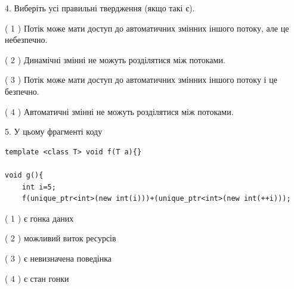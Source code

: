 \documentclass[12pt, ukrainian]{article}
\begin{document}
\begin {large}
{%
4. Виберіть усі правильні твердження (якщо такі є).\par
\vspace{2mm}

( 1 ) Потік може мати доступ до автоматичних змінних іншого потоку, але це небезпечно.%

( 2 ) Динамічні змінні не можуть розділятися між потоками.%

( 3 ) Потік може мати доступ до автоматичних змінних іншого потоку і це безпечно.%

( 4 ) Автоматичні змінні не можуть розділятися між потоками.%


5. У цьому фрагменті коду
\begin{verbatim}
template <class T> void f(T a){}

void g(){
    int i=5;
    f(unique_ptr<int>(new int(i)))+(unique_ptr<int>(new int(++i)));
\end{verbatim}
( 1 ) є гонка даних%

( 2 ) можливий виток ресурсів%

( 3 ) є невизначена поведінка%

( 4 ) є стан гонки%
}
\end {large}
\end{document}
